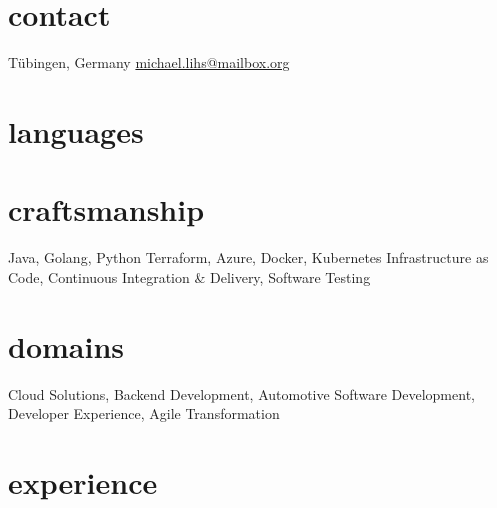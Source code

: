 \documentclass[]{friggeri-cv} %
\begin{document}


\begin{aside} %
\section{\color{red}contact}
Tübingen, Germany
\href{mailto:michael.lihs@mailbox.org}{michael.lihs@mailbox.org}
\section{\color{red}languages}
\section{\color{red}craftsmanship}
Java, Golang, Python
Terraform, Azure,
Docker, Kubernetes
Infrastructure as Code,
Continuous Integration \& Delivery,
Software Testing
\section{\color{red}domains}
Cloud Solutions,
Backend Development,
Automotive Software Development,
Developer Experience,
Agile Transformation
\end{aside}


\section{\color{red}experience}

\end{document}

